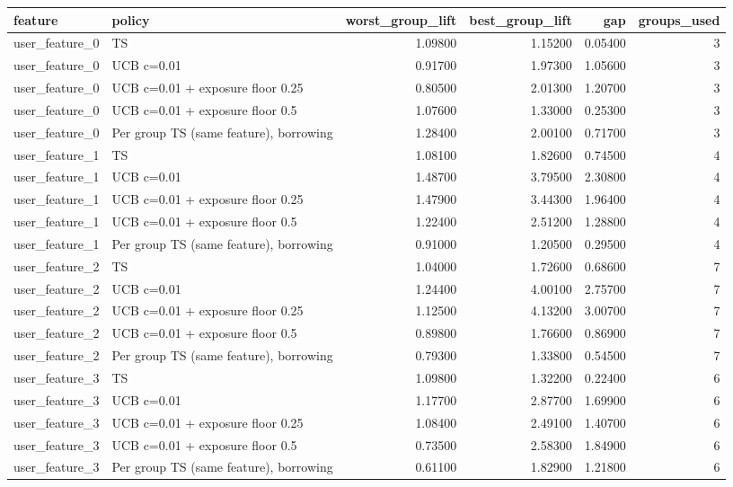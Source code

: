 \begin{tabular}{llrrrr}
\toprule
feature & policy & worst\_group\_lift & best\_group\_lift & gap & groups\_used \\
\midrule
user\_feature\_0 & TS & 1.09800 & 1.15200 & 0.05400 & 3 \\
user\_feature\_0 & UCB c=0.01 & 0.91700 & 1.97300 & 1.05600 & 3 \\
user\_feature\_0 & UCB c=0.01 + exposure floor 0.25 & 0.80500 & 2.01300 & 1.20700 & 3 \\
user\_feature\_0 & UCB c=0.01 + exposure floor 0.5 & 1.07600 & 1.33000 & 0.25300 & 3 \\
user\_feature\_0 & Per group TS (same feature), borrowing & 1.28400 & 2.00100 & 0.71700 & 3 \\
user\_feature\_1 & TS & 1.08100 & 1.82600 & 0.74500 & 4 \\
user\_feature\_1 & UCB c=0.01 & 1.48700 & 3.79500 & 2.30800 & 4 \\
user\_feature\_1 & UCB c=0.01 + exposure floor 0.25 & 1.47900 & 3.44300 & 1.96400 & 4 \\
user\_feature\_1 & UCB c=0.01 + exposure floor 0.5 & 1.22400 & 2.51200 & 1.28800 & 4 \\
user\_feature\_1 & Per group TS (same feature), borrowing & 0.91000 & 1.20500 & 0.29500 & 4 \\
user\_feature\_2 & TS & 1.04000 & 1.72600 & 0.68600 & 7 \\
user\_feature\_2 & UCB c=0.01 & 1.24400 & 4.00100 & 2.75700 & 7 \\
user\_feature\_2 & UCB c=0.01 + exposure floor 0.25 & 1.12500 & 4.13200 & 3.00700 & 7 \\
user\_feature\_2 & UCB c=0.01 + exposure floor 0.5 & 0.89800 & 1.76600 & 0.86900 & 7 \\
user\_feature\_2 & Per group TS (same feature), borrowing & 0.79300 & 1.33800 & 0.54500 & 7 \\
user\_feature\_3 & TS & 1.09800 & 1.32200 & 0.22400 & 6 \\
user\_feature\_3 & UCB c=0.01 & 1.17700 & 2.87700 & 1.69900 & 6 \\
user\_feature\_3 & UCB c=0.01 + exposure floor 0.25 & 1.08400 & 2.49100 & 1.40700 & 6 \\
user\_feature\_3 & UCB c=0.01 + exposure floor 0.5 & 0.73500 & 2.58300 & 1.84900 & 6 \\
user\_feature\_3 & Per group TS (same feature), borrowing & 0.61100 & 1.82900 & 1.21800 & 6 \\
\bottomrule
\end{tabular}
